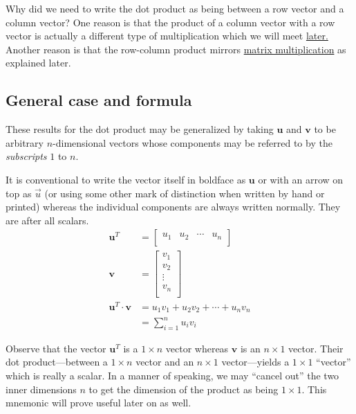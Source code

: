 \documentclass[
  a4paper,
]{article}
\begin{document}
Why did we need to write the dot product as being between a row vector
and a column vector? One reason is that the product of a column vector
with a row vector is actually a different type of multiplication which
we will meet \protect\hyperlink{outer-product-of-two-vectors}{later.}
Another reason is that the row-column product mirrors
\protect\hyperlink{example-of-matrix-multiplication}{matrix
multiplication} as explained later.

\hypertarget{general-case-and-formula}{%
\subsection{General case and formula}\label{general-case-and-formula}}

These results for the dot product may be generalized by taking
\(\mathbf{u}\) and \(\mathbf{v}\) to be arbitrary \(n\)-dimensional
vectors whose components may be referred to by the \emph{subscripts}
\(1\) to \(n\).

It is conventional to write the vector itself in boldface as
\(\mathbf{u}\) or with an arrow on top as \(\vec{u}\) (or using some
other mark of distinction when written by hand or printed) whereas the
individual components are always written normally. They are after all
scalars. \[
\begin{aligned}
\mathbf{u}^{T} &= \begin{bmatrix}u_{1} & u_{2} &  \cdots & u_{n}\\\end{bmatrix}\\
\mathbf{v} &= \begin{bmatrix}v_{1} \\ v_{2} \\ \vdots \\ v_{n}\\\end{bmatrix}\\
\mathbf{u}^{T}\cdot\mathbf{v} &= u_{1}v_{1} + u_{2}v_{2} + \cdots + u_{n}v_{n}\\
&= \sum_{i=1}^{n} u_{i}v_{i}
\end{aligned}
\]

Observe that the vector \(\mathbf{u}^{T}\) is a \(1 \times n\) vector
whereas \(\mathbf{v}\) is an \(n \times 1\) vector. Their dot
product---between a \(1 \times n\) vector and an \(n \times 1\)
vector---yields a \(1 \times 1\) ``vector'' which is really a scalar. In
a manner of speaking, we may ``cancel out'' the two inner dimensions
\(n\) to get the dimension of the product as being \(1 \times 1\). This
mnemonic will prove useful later on as well.
\end{document}
